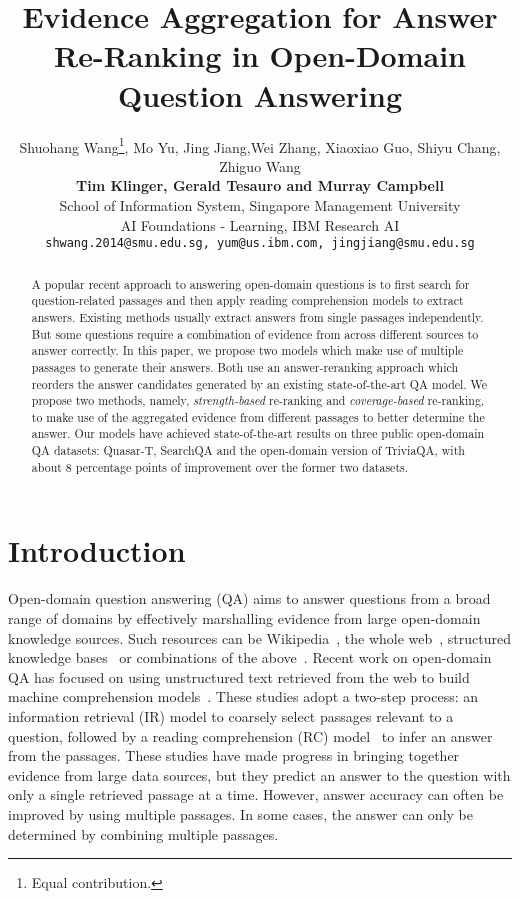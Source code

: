 \documentclass{article} \usepackage{iclr2018_conference,times}
\title{Evidence Aggregation for Answer Re-Ranking in Open-Domain Question Answering}
\author{Shuohang Wang\thanks{Equal contribution.}, Mo Yu\samethanks,  Jing Jiang,Wei Zhang, Xiaoxiao Guo, Shiyu Chang, Zhiguo Wang\\
\textbf{Tim Klinger, Gerald Tesauro and Murray Campbell} \\
{School of Information System, Singapore Management University}\\
{AI Foundations - Learning, IBM Research AI}\\
{\texttt {shwang.2014@smu.edu.sg,
 yum@us.ibm.com,
 jingjiang@smu.edu.sg}}
}
\begin{document}
\maketitle

\begin{abstract}
A popular recent approach to answering open-domain questions is to first search for question-related passages and then apply reading comprehension models to extract answers. Existing methods usually extract answers from single passages independently.  But some questions require a combination of evidence from across different sources to answer correctly. In this paper, we propose two models which make use of multiple passages to generate their answers.  Both use an answer-reranking approach which reorders the answer candidates generated by an existing state-of-the-art QA model. We propose two methods, namely, \textit{strength-based} re-ranking and \textit{coverage-based} re-ranking, to make use of the aggregated evidence from different passages to better determine the answer. Our models have achieved state-of-the-art results on three public open-domain QA datasets: Quasar-T, SearchQA and the open-domain version of TriviaQA, with about 8 percentage points of improvement over the former two datasets. 

\end{abstract}

\section{Introduction}

Open-domain question answering (QA) aims to answer questions from a broad range of domains by effectively marshalling evidence from large open-domain knowledge sources. Such resources can be Wikipedia~\citep{chen2017reading}, the whole web~\citep{ferrucci2010building}, structured knowledge bases~\citep{berant2013semantic,yu2017improved} or combinations of the above~\citep{baudivs2015modeling}. Recent work on open-domain QA has focused on using unstructured text retrieved from the web to build machine comprehension models~\citep{chen2017reading,dhingra2017quasar,wang2017r}.
These studies adopt a two-step process: an information retrieval (IR) model to coarsely select passages relevant to a question, followed by a reading comprehension (RC) model~\citep{wang2016machine,seo2016bidirectional,chen2017reading} to infer an answer from the passages. 
These studies have made progress in bringing together evidence from large data sources, but they predict an answer to the question with only a single retrieved passage at a time.
However, answer accuracy can often be improved by using multiple passages. In some cases, the answer can only be determined by combining multiple passages.
\end{document}
